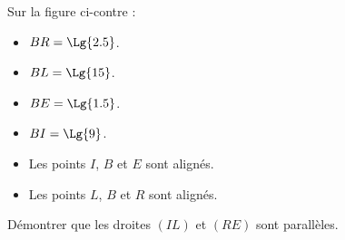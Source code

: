 \begin{exercice*}
    Sur la figure ci-contre :

    \begin{minipage}{0.65\linewidth}
        \begin{itemize}
            \item $BR=\Lg{2.5}$.
            \item $BL=\Lg{15}$.
            \item $BE=\Lg{1.5}$.
            \item $BI=\Lg{9}$.
            \item Les points $I$, $B$ et $E$ sont alignés.
            \item Les points $L$, $B$ et $R$ sont alignés.            
        \end{itemize}
    \end{minipage}
    \begin{minipage}{0.35\linewidth}        
    \end{minipage}

    Démontrer que les droites $(IL)$ et $(RE)$ sont parallèles.

\end{exercice*}
\begin{corrige}
    \phantom{rrr}

\end{corrige}


